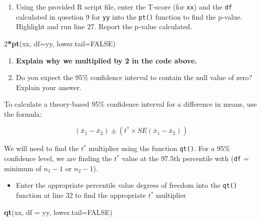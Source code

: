 \documentclass[
]{report}
\newenvironment{Shaded}{\begin{snugshade}}{\end{snugshade}}
\newcommand{\AttributeTok}[1]{\textcolor[rgb]{0.13,0.29,0.53}{#1}}
\newcommand{\ConstantTok}[1]{\textcolor[rgb]{0.56,0.35,0.01}{#1}}
\newcommand{\DecValTok}[1]{\textcolor[rgb]{0.00,0.00,0.81}{#1}}
\newcommand{\FunctionTok}[1]{\textcolor[rgb]{0.13,0.29,0.53}{\textbf{#1}}}
\newcommand{\NormalTok}[1]{#1}
\newcommand{\SpecialCharTok}[1]{\textcolor[rgb]{0.81,0.36,0.00}{\textbf{#1}}}
\providecommand{\tightlist}{%
  \setlength{\itemsep}{0pt}\setlength{\parskip}{0pt}}
\begin{document}
\vspace{0.2in}

\begin{enumerate}
\def\labelenumi{\arabic{enumi}.}
\setcounter{enumi}{9}
\tightlist
\item
  Using the provided R script file, enter the T-score (for \texttt{xx}) and the \texttt{df} calculated in question 9 for \texttt{yy} into the \texttt{pt()} function to find the p-value. Highlight and run line 27. Report the p-value calculated.
\end{enumerate}

\begin{Shaded}
\begin{Highlighting}[]
\DecValTok{2}\SpecialCharTok{*}\FunctionTok{pt}\NormalTok{(xx, }\AttributeTok{df=}\NormalTok{yy, }\AttributeTok{lower.tail=}\ConstantTok{FALSE}\NormalTok{)}
\end{Highlighting}
\end{Shaded}

\vspace{0.2in}

\begin{enumerate}
\def\labelenumi{\arabic{enumi}.}
\setcounter{enumi}{10}
\item
  \textbf{Explain why we multiplied by 2 in the code above.}
  \vspace{0.3in}
\item
  Do you expect the 95\% confidence interval to contain the null value of zero? Explain your answer.
  \vspace{0.8in}
\end{enumerate}

To calculate a theory-based 95\% confidence interval for a difference in means, use the formula:

\[(\bar{x}_1- \bar{x}_2)\pm (t^* \times SE(\bar{x}_1- \bar{x}_2))\]

We will need to find the \(t^*\) multiplier using the function \texttt{qt()}. For a 95\% confidence level, we are finding the \(t^*\) value at the 97.5th percentile with (\texttt{df} = minimum of \(n_1 - 1\) or \(n_2 - 1\)).

\begin{itemize}
\tightlist
\item
  Enter the appropriate percentile value degrees of freedom into the \texttt{qt()} function at line 32 to find the appropriate \(t^*\) multiplier
\end{itemize}

\begin{Shaded}
\begin{Highlighting}[]
\FunctionTok{qt}\NormalTok{(xx, }\AttributeTok{df =}\NormalTok{ yy, }\AttributeTok{lower.tail=}\ConstantTok{FALSE}\NormalTok{)}
\end{Highlighting}
\end{Shaded}
\end{document}
